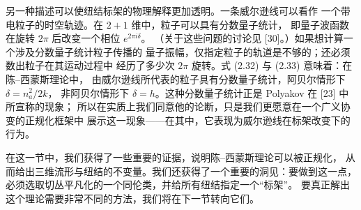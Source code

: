 \documentclass[11pt,a4paper]{article}
\begin{document}
另一种描述可以使纽结标架的物理解释更加透明。一条威尔逊线可以看作
一个带电粒子的时空轨迹。在 $2+1$ 维中，粒子可以具有分数量子统计，
即量子波函数在旋转 $2\pi$ 后改变一个相位 $e^{2\pi i\delta}$。
（关于这些问题的讨论见 [30]。）如果想计算一个涉及分数量子统计粒子传播的
量子振幅，仅指定粒子的轨道是不够的；还必须数出粒子在其运动过程中
经历了多少次 $2\pi$ 旋转。式 (2.32) 与 (2.33) 意味着：在陈–西蒙斯理论中，
由威尔逊线所代表的粒子具有分数量子统计，阿贝尔情形下 $\delta=n_a^2/2k$，
非阿贝尔情形下 $\delta=h$。这种分数量子统计正是 Polyakov 在 [23] 中所宣称的现象；
所以在实质上我们同意他的论断，只是我们更愿意在一个广义协变的正规化框架中
展示这一现象——在其中，它表现为威尔逊线在标架改变下的行为。


在这一节中，我们获得了一些重要的证据，说明陈–西蒙斯理论可以被正规化，
从而给出三维流形与纽结的不变量。我们还获得了一个重要的洞见：要做到这一点，
必须选取切丛平凡化的一个同伦类，并给所有纽结指定一个“标架”。
要真正解出这个理论需要非常不同的方法，我们将在下一节转向它们。

\end{document}
